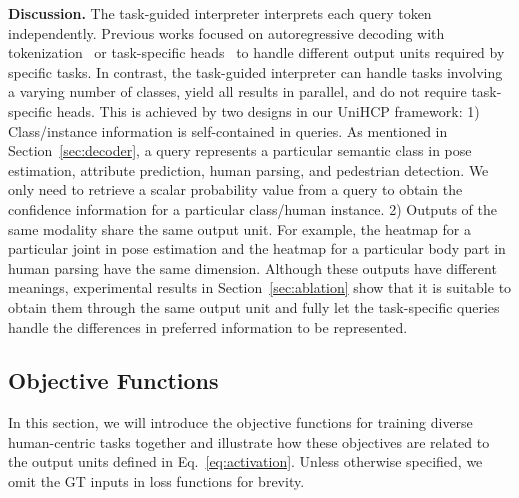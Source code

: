 \documentclass[10pt,twocolumn,letterpaper]{article}
\begin{document}
\noindent\textbf{Discussion.} The task-guided interpreter interprets each query token independently. Previous works focused on autoregressive decoding with tokenization~\cite{chen2022unified, lu2022unified} or task-specific heads~\cite{yuan2021florence,hu2021unit} to handle different output units required by specific tasks. In contrast, the task-guided interpreter can handle tasks involving a varying number of classes, yield all results in parallel, and do not require task-specific heads. This is achieved by two designs in our UniHCP framework: 1) Class/instance information is self-contained in queries. As mentioned in Section~\ref{sec:decoder}, a query represents a particular semantic class in pose estimation, attribute prediction, human parsing, and pedestrian detection. We only need to retrieve a scalar probability value from a query to obtain the confidence information for a particular class/human instance. 2) Outputs of the same modality share the same output unit. For example, the heatmap for a particular joint in pose estimation and the heatmap for a particular body part in human parsing have the same dimension. 
Although these outputs have different meanings, experimental results in Section~\ref{sec:ablation} show that it is suitable to obtain them through the same output unit and fully let the task-specific queries handle the differences in preferred information to be represented.








































\subsection{Objective Functions} \label{sec:objectives}
In this section, we will introduce the objective functions for training diverse human-centric tasks together and illustrate how these objectives are related to the output units defined in Eq.~\ref{eq:activation}. Unless otherwise specified, we omit the GT inputs in loss functions for brevity.
\end{document}
